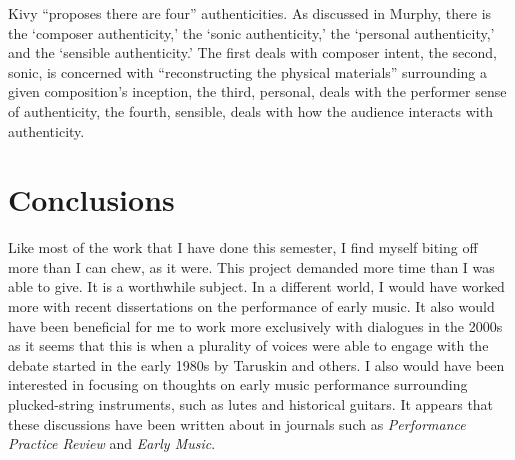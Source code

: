 \documentclass[12pt]{article}
\begin{document}
Kivy ``proposes there are four'' authenticities.\autocite{kivy1995} As
discussed in Murphy, there is the `composer authenticity,' the `sonic
authenticity,' the `personal authenticity,' and the `sensible
authenticity.'\autocite[26]{murphy2008} The first deals with composer
intent, the second, sonic, is concerned with ``reconstructing the
physical materials'' surrounding a given composition's inception, the
third, personal, deals with the performer sense of authenticity, the
fourth, sensible, deals with how the audience interacts with
authenticity.

\section{Conclusions}
\label{sec:conclusions}

Like most of the work that I have done this semester, I find myself
biting off more than I can chew, as it were. This project demanded
more time than I was able to give. It is a worthwhile subject. In a
different world, I would have worked more with recent dissertations on
the performance of early music. It also would have been beneficial for
me to work more exclusively with dialogues in the 2000s as it seems
that this is when a plurality of voices were able to engage with the
debate started in the early 1980s by Taruskin and others. I also would
have been interested in focusing on thoughts on early music
performance surrounding plucked-string instruments, such as lutes and
historical guitars. It appears that these discussions have been
written about in journals such as \emph{Performance Practice Review}
and \emph{Early Music}.


\clearpage
\nocite{*}
\printbibliography
\end{document}
